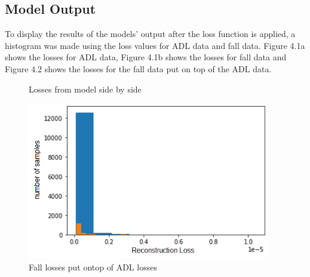 \subsection{Model Output}
To display the results of the models' output after the loss function is applied, a histogram was made using the loss values for ADL data and fall data. Figure 4.1a shows the losses for ADL data, Figure 4.1b shows the losses for fall data and Figure 4.2 shows the losses for the fall data put on top of the ADL data.
\begin{figure}[!ht]
    \caption{Losses from model side by side}
    \label{fig:my_label}
\end{figure}

\begin{figure}[H]
    \centering
    \includegraphics[width=400px, keepaspectratio=true]{combined_losses.png}
    \caption{Fall losses put ontop of ADL losses}
    \label{fig:my_label}
\end{figure}

